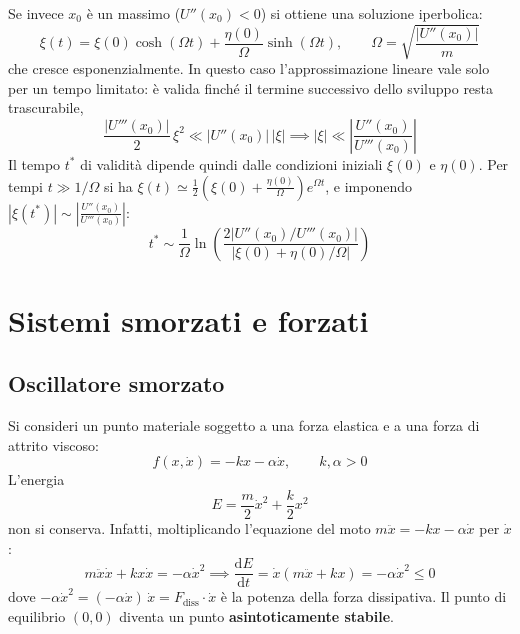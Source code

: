 \documentclass[11pt, a4paper, openright]{book}
\theoremstyle{plain}
\theoremstyle{definition}
\theoremstyle{remark}
\begin{document}
Se invece $x_0$ è un massimo ($U''(x_0) < 0$) si ottiene una soluzione iperbolica:
\begin{equation}
    \xi(t) = \xi(0)\cosh(\Omega t) + \frac{\eta(0)}{\Omega}\sinh(\Omega t), \qquad \Omega = \sqrt{\frac{|U''(x_0)|}{m}}
\end{equation}
che cresce esponenzialmente. In questo caso l'approssimazione lineare vale solo per un tempo limitato: è valida finché il termine successivo dello sviluppo resta trascurabile,
\begin{equation}
    \frac{|U'''(x_0)|}{2}\,\xi^2 \ll |U''(x_0)|\,|\xi| \implies |\xi| \ll \left|\frac{U''(x_0)}{U'''(x_0)}\right|
\end{equation}
Il tempo $t^*$ di validità dipende quindi dalle condizioni iniziali $\xi(0)$ e $\eta(0)$. Per tempi $t \gg 1/\Omega$ si ha $\xi(t) \simeq \frac{1}{2}\left(\xi(0) + \frac{\eta(0)}{\Omega}\right)e^{\Omega t}$, e imponendo $|\xi(t^*)| \sim \left|\frac{U''(x_0)}{U'''(x_0)}\right|$:
\begin{equation}
    t^* \sim \frac{1}{\Omega}\ln\left(\frac{2\left|U''(x_0)/U'''(x_0)\right|}{\left|\xi(0) + \eta(0)/\Omega\right|}\right)
\end{equation}

\section{Sistemi smorzati e forzati}

\subsection{Oscillatore smorzato}
Si consideri un punto materiale soggetto a una forza elastica e a una forza di attrito viscoso:
\begin{equation}
    f(x, \dot{x}) = -kx - \alpha\dot{x}, \qquad k, \alpha > 0
\end{equation}
L'energia
\begin{equation}
    E = \frac{m}{2}\dot{x}^2 + \frac{k}{2}x^2
\end{equation}
non si conserva. Infatti, moltiplicando l'equazione del moto $m\ddot{x} = -kx - \alpha\dot{x}$ per $\dot{x}$:
\begin{equation}
    m\ddot{x}\dot{x} + kx\dot{x} = -\alpha\dot{x}^2 \implies \frac{\mathrm{d}E}{\mathrm{d}t} = \dot{x}\left(m\ddot{x} + kx\right) = -\alpha\dot{x}^2 \leq 0
\end{equation}
dove $-\alpha\dot{x}^2 = (-\alpha\dot{x})\,\dot{x} = F_{\mathrm{diss}}\cdot\dot{x}$ è la potenza della forza dissipativa. Il punto di equilibrio $(0, 0)$ diventa un punto \textbf{asintoticamente stabile}.
\end{document}

